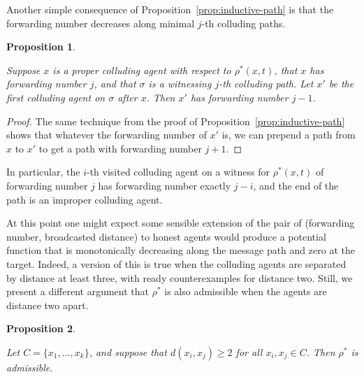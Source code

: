 \documentclass[reprint]{revtex4-1}
\newtheorem{proposition}{Proposition}[section]
\begin{document}
Another simple consequence of Proposition~\ref{prop:inductive-path} is that the
forwarding number decreases along minimal $j$-th colluding paths.

\begin{proposition} \label{prop:inductive-forwarding-number}

Suppose $x$ is a proper colluding agent with respect to $\rho^*(x,t)$, that $x$
has forwarding number $j$, and that $\sigma$ is a witnessing $j$-th colluding
path. Let $x'$ be the first colluding agent on $\sigma$ after $x$. Then $x'$
has forwarding number $j-1$.  

\end{proposition}

\begin{proof}

The same technique from the proof of Proposition~\ref{prop:inductive-path}
shows that whatever the forwarding number of $x'$ is, we can prepend a path from
$x$ to $x'$ to get a path with forwarding number $j+1$.
\end{proof}

In particular, the $i$-th visited colluding agent on a witness for
$\rho^*(x,t)$ of forwarding number $j$ has forwarding number exactly $j - i$,
and the end of the path is an improper colluding agent.

At this point one might expect some sensible extension of the pair of
(forwarding number, broadcasted distance) to honest agents would produce a
potential function that is monotonically decreasing along the message path and
zero at the target. Indeed, a version of this is true when the colluding agents
are separated by distance at least three, with ready counterexamples for
distance two. Still, we present a different argument that $\rho^*$ is also
admissible when the agents are distance two apart.
 
\begin{proposition} \label{prop:rhostar-admissible}

Let $C = \{ x_1, \dots, x_k \}$, and suppose that $d(x_i, x_j) \geq 2$ for all
$x_i, x_j \in C$. Then $\rho^*$ is admissible.

\end{proposition}
\end{document}
